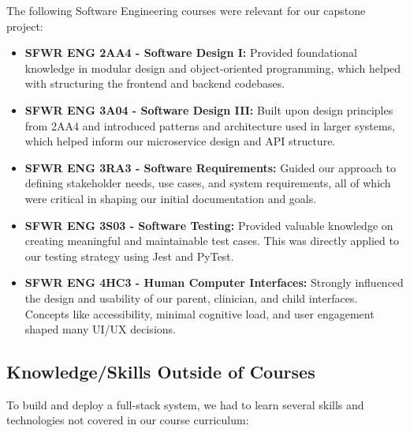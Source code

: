 \documentclass{article}
\begin{document}
The following Software Engineering courses were relevant for our capstone project: 

\begin{itemize}
    \item \textbf{SFWR ENG 2AA4 - Software Design I:} Provided foundational knowledge in modular design and object-oriented programming, which helped with structuring the frontend and backend codebases.
    
    \item \textbf{SFWR ENG 3A04 - Software Design III:} Built upon design principles from 2AA4 and introduced patterns and architecture used in larger systems, which helped inform our microservice design and API structure.
    
    \item \textbf{SFWR ENG 3RA3 - Software Requirements:} Guided our approach to defining stakeholder needs, use cases, and system requirements, all of which were critical in shaping our initial documentation and goals.
    
    \item \textbf{SFWR ENG 3S03 - Software Testing:} Provided valuable knowledge on creating meaningful and maintainable test cases. This was directly applied to our testing strategy using Jest and PyTest.
    
    \item \textbf{SFWR ENG 4HC3 - Human Computer Interfaces:} Strongly influenced the design and usability of our parent, clinician, and child interfaces. Concepts like accessibility, minimal cognitive load, and user engagement shaped many UI/UX decisions.
\end{itemize}


\subsection{Knowledge/Skills Outside of Courses}

To build and deploy a full-stack system, we had to learn several skills and technologies not covered in our course curriculum:
\end{document}
